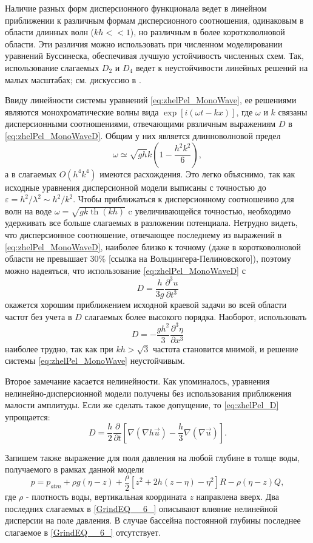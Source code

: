 Наличие разных форм дисперсионного функционала ведет в линейном приближении к различным формам дисперсионного соотношения, одинаковым в области длинных волн ($kh<<1$), но различным в более коротковолновой области. Эти различия можно использовать при численном моделировании уравнений Буссинеска, обеспечивая лучшую устойчивость численных схем. Так, использование слагаемых $D_2$ и $D_4$ ведет к неустойчивости линейных решений на малых масштабах; см. дискуссию в \cite{pel_2006}.

Ввиду линейности системы уравнений \eqref{eq:zhelPel_MonoWave}, ее решениями являются монохроматические волны вида $\exp[i(\omega t-kx)]$, где $\omega$ и $k$ связаны дисперсионными соотношениями, отвечающими рвзличным выражениям $D$ в \eqref{eq:zhelPel_MonoWaveD}. Общим у них является длинноволновой предел
\begin{equation}\label{eq:zhelPel_disp}
\omega\simeq\sqrt{gh}k\left(1-\frac{h^2k^2}{6}\right),
\end{equation}
а в слагаемых $O(h^4k^4)$ имеются расхождения. Это легко объяснимо, так как исходные уравнения дисперсионной модели выписаны с точностью до $\varepsilon=h^2/\lambda^2\sim h^2/k^2$. Чтобы приближаться к дисперсионному соотношению для волн на воде $\omega=\sqrt{gk\operatorname{th}(kh)}$ c увеличивающейся точностью, необходимо удерживать все больше слагаемых в разложении потенциала. Нетрудно видеть, что дисперсионное соотношение, отвечающее последнему из выражений в \eqref{eq:zhelPel_MonoWaveD}, наиболее близко к точному (даже в коротковолновой области не превышает 30\% \textcolor[rgb]{1.00,0.00,0.00}{[ссылка на Вольцингера-Пелиновского]}), поэтому можно надеяться, что использование \eqref{eq:zhelPel_MonoWaveD} с
$$
D=\frac{h}{3g}\frac{\partial^3u}{\partial t^3}
$$
окажется хорошим приближением исходной краевой задачи во всей области частот без учета в $D$ слагаемых более высокого порядка. Наоборот, использовать
$$
D=-\frac{gh^2}{3}\frac{\partial^3\eta}{\partial x^3}
$$
наиболее трудно, так как при $kh>\sqrt{3}$ частота становится мнимой, и решение системы \eqref{eq:zhelPel_MonoWave} неустойчивым.

Второе замечание касается нелинейности. Как упоминалось, уравнения нелинейно-дисперсионной модели получены без использования приближения малости амплитуды. Если же сделать такое допущение, то \eqref{eq:zhelPel_D} упрощается:
$$
D = \frac{h}{2}\frac{\partial}{\partial t}\left[\nabla(\nabla h\vec{u})-\frac{h}{3}\nabla(\nabla\vec{u})\right].
$$

 Запишем также выражение для поля давления на любой глубине в толще воды, получаемого в рамках данной модели \cite{Zhel_1985}\cite{Zhel_Pel_1985}
\begin{equation} \label{GrindEQ__6_}
p=p_{atm} +\rho g(\eta -z)+\frac{\rho }{2} \left[z^{2} +2h(z-\eta )-\eta ^{2} \right]R-\rho (\eta -z)Q,
\end{equation}
где $\rho$ - плотность воды, вертикальная координата $z$ направлена вверх. Два последних слагаемых в \eqref{GrindEQ__6_} описывают влияние нелинейной дисперсии на поле давления. В случае бассейна постоянной глубины последнее слагаемое в \eqref{GrindEQ__6_} отсутствует.

